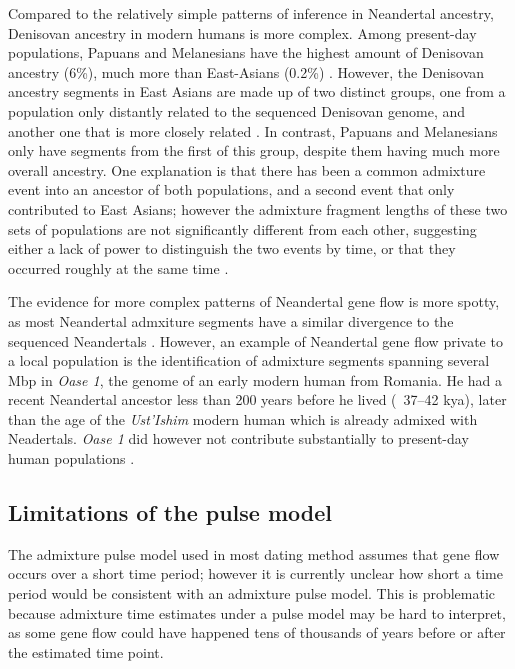 \documentclass[]{article}
\begin{document}
Compared to the relatively simple patterns of inference in Neandertal ancestry, Denisovan ancestry in modern humans is more complex. Among present-day populations, Papuans and Melanesians have the highest amount of Denisovan ancestry (6\%), much more than East-Asians (0.2\%) \citep{reich_genetic_2010,meyer_high-coverage_2012}.
However, the Denisovan ancestry segments in East Asians are made up of two distinct groups, one from a population only distantly related to the sequenced Denisovan genome, and another one that is more closely related \citep{browning_analysis_2018}. In contrast, Papuans and Melanesians only have segments from the first of this group, despite them having much more overall ancestry.
One explanation is that there has been a common admixture event into an ancestor of both populations, and a second event that only contributed to East Asians; however the admixture fragment lengths of these two sets of populations are not significantly different from each other, suggesting either a lack of power to distinguish the two events by time, or that they occurred roughly at the same time \citep{browning_analysis_2018}.



The evidence for more complex patterns of Neandertal gene flow is more spotty, as most Neandertal admxiture segments have a similar divergence to the sequenced Neandertals \citep{browning_analysis_2018}. However, an example of  Neandertal gene flow private to a local population is the identification of admixture segments spanning several Mbp in \textit{Oase 1}, the genome of an early modern human from Romania. He had a recent Neandertal ancestor less than 200 years before he lived (~37–42 kya), later than the age of the \textit{Ust'Ishim} modern human which is already admixed with Neadertals. \textit{Oase 1} did however not contribute substantially to present-day human populations  \citep{fu_genome_2014,fu_early_2015}.


\subsection{Limitations of the pulse model}\label{Why can't we us the pulse model}

The admixture pulse model used in most dating method assumes that gene flow occurs over a short time period; however it is currently unclear how short a time period would be consistent with an admixture pulse model. This is problematic because admixture time estimates under a pulse model may be hard to interpret, as some gene flow could have happened tens of thousands of years before or after the estimated time point.
\end{document}
